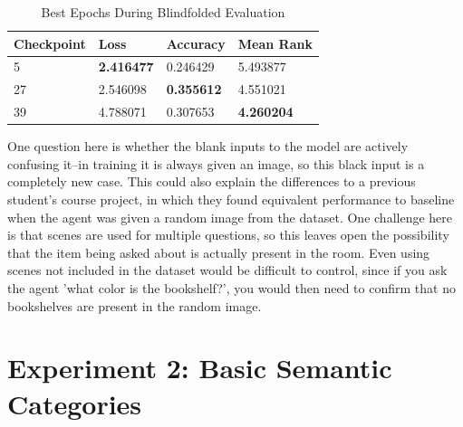\begin{table}[h]
\centering
\caption{Best Epochs During Blindfolded Evaluation}
\begin{tabular}{l | l | l | l}
Checkpoint & Loss & Accuracy & Mean Rank \\
\hline
5 & \textbf{2.416477} & 0.246429 & 5.493877 \\
27 & 2.546098 & \textbf{0.355612} & 4.551021 \\
39 & 4.788071 & 0.307653 & \textbf{4.260204}
\end{tabular}
\label{tab:best_blindfolded}
\end{table}

One question here is whether the blank inputs to the model are actively confusing it--in training it is always given an image, so this black input is a completely new case. This could also explain the differences to a previous student's course project, in which they found equivalent performance to baseline when the agent was given a random image from the dataset. One challenge here is that scenes are used for multiple questions, %
so this leaves open the possibility that the item being asked about is actually present in the room. Even using scenes not included in the dataset would be difficult to control, since if you ask the agent 'what color is the bookshelf?', you would then need to confirm that no bookshelves are present in the random image. \newline


\section{Experiment 2: Basic Semantic Categories}
\label{sec:exp_2}
